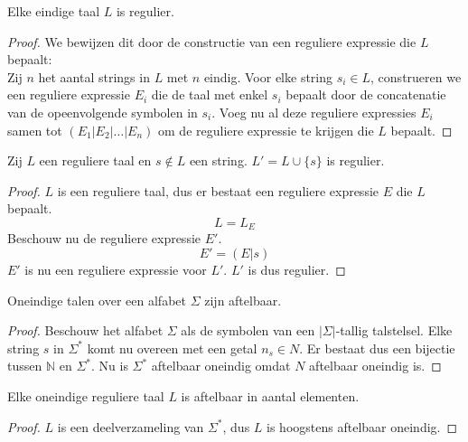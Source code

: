 \documentclass[main.tex]{subfiles}
\begin{document}
\begin{st}
  Elke eindige taal $L$ is regulier.

  \begin{proof}
    We bewijzen dit door de constructie van een reguliere expressie die $L$ bepaalt:\\
    Zij $n$ het aantal strings in $L$ met $n$ eindig.
    Voor elke string $s_{i} \in L$, construeren we een reguliere expressie $E_{i}$ die de taal met enkel $s_{i}$ bepaalt door de concatenatie van de opeenvolgende symbolen in $s_{i}$. 
    Voeg nu al deze reguliere expressies $E_{i}$ samen tot $(E_{1}|E_{2}|\ldots|E_{n})$ om de reguliere expressie te krijgen die $L$ bepaalt.
  \end{proof}
\end{st}

\begin{st}
  Zij $L$ een reguliere taal en $s \not \in L$ een string.
  $L' = L \cup \{s\}$ is regulier.
  \begin{proof}
    $L$ is een reguliere taal, dus er bestaat een reguliere expressie $E$ die $L$ bepaalt.
    \[ L = L_{E} \]
    Beschouw nu de reguliere expressie $E'$.
    \[ E' = (E | s) \]
    $E'$ is nu een reguliere expressie voor $L'$. 
    $L'$ is dus regulier.
  \end{proof}
\end{st}

\begin{st}
  \label{sigma-ster-aftelbaar}
  Oneindige talen over een alfabet $\Sigma$ zijn aftelbaar.

  \begin{proof}
    Beschouw het alfabet $\Sigma$ als de symbolen van een $|\Sigma|$-tallig talstelsel.
    Elke string $s$ in $\Sigma^{*}$ komt nu overeen met een getal $n_{s} \in N$.
    Er bestaat dus een bijectie tussen $\mathbb N$ en $\Sigma^{*}$. 
    Nu is $\Sigma^{*}$ aftelbaar oneindig omdat $N$ aftelbaar oneindig is.
  \end{proof}
\end{st}

\begin{st}
  Elke oneindige reguliere taal $L$ is aftelbaar in aantal elementen.

  \begin{proof}
    $L$ is een deelverzameling van $\Sigma^{*}$, dus $L$ is hoogstens aftelbaar oneindig.
  \end{proof}
\end{st}
\end{document}
